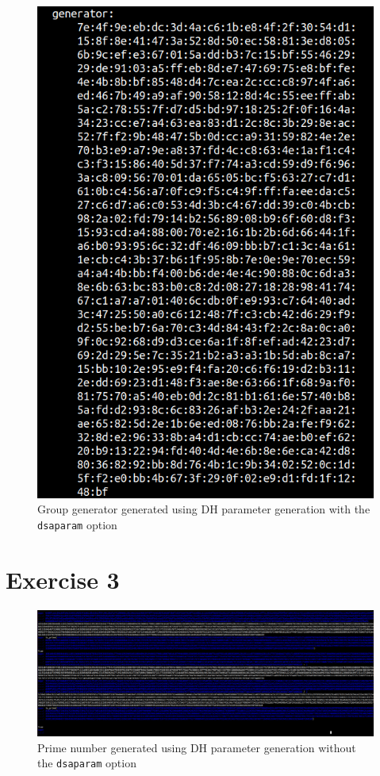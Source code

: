 \documentclass[a4paper]{article}
\begin{document}
\begin{appendices}
\begin{figure}[H]
    \centering
    \includegraphics[width=.8\textwidth]{img/dsa-generator.png}
    \caption{Group generator generated using DH parameter generation with the \texttt{dsaparam} option}
    \label{fig:dsa-generator}
\end{figure}

\section*{Exercise 3}

\begin{figure}[H]
    \centering
    \includegraphics[width=\textwidth]{img/dh-sage.png}
    \caption{Prime number generated using DH parameter generation without the \texttt{dsaparam} option}
    \label{fig:sage-dh}
\end{figure}


\end{appendices}
\end{document}
